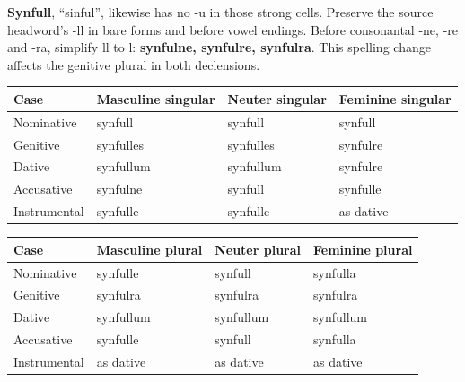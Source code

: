\textbf{Synfull}, “sinful”, likewise has no -u in those strong cells. Preserve the source headword's -ll in bare forms and before vowel endings. Before consonantal -ne, -re and -ra, simplify ll to l: \textbf{synfulne, synfulre, synfulra}. This spelling change affects the genitive plural in both declensions.

\par\begingroup
\fontsize{10.5}{13.2}\selectfont
\setlength{\LTleft}{0pt}\setlength{\LTright}{\fill}
\noindent
\begin{tabular}{@{}>{\raggedright\arraybackslash}p{22.0mm}>{\raggedright\arraybackslash}p{31.188mm}>{\raggedright\arraybackslash}p{31.188mm}>{\raggedright\arraybackslash}p{31.188mm}@{}}
\toprule
\textbf{Case} & \textbf{Masculine singular} & \textbf{Neuter singular} & \textbf{Feminine singular} \\
\midrule
Nominative & synfull & synfull & synfull \\
Genitive & synfulles & synfulles & synfulre \\
Dative & synfullum & synfullum & synfulre \\
Accusative & synfulne & synfull & synfulle \\
Instrumental & synfulle & synfulle & as dative \\
\bottomrule
\end{tabular}
\par\endgroup
\par\addvspace{5pt}
\par\begingroup
\fontsize{10.5}{13.2}\selectfont
\setlength{\LTleft}{0pt}\setlength{\LTright}{\fill}
\noindent
\begin{tabular}{@{}>{\raggedright\arraybackslash}p{22.0mm}>{\raggedright\arraybackslash}p{31.188mm}>{\raggedright\arraybackslash}p{31.188mm}>{\raggedright\arraybackslash}p{31.188mm}@{}}
\toprule
\textbf{Case} & \textbf{Masculine plural} & \textbf{Neuter plural} & \textbf{Feminine plural} \\
\midrule
Nominative & synfulle & synfull & synfulla \\
Genitive & synfulra & synfulra & synfulra \\
Dative & synfullum & synfullum & synfullum \\
Accusative & synfulle & synfull & synfulla \\
Instrumental & as dative & as dative & as dative \\
\bottomrule
\end{tabular}
\par\endgroup

